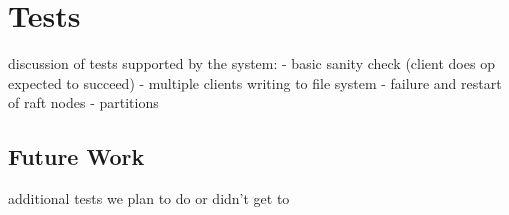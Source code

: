 \documentclass[UTF8]{article}
\begin{document}
\section{Tests}

discussion of tests supported by the system:
- basic sanity check (client does op expected to succeed)
- multiple clients writing to file system
- failure and restart of raft nodes
- partitions

\subsection{Future Work}

additional tests we plan to do or didn't get to




\end{document}
